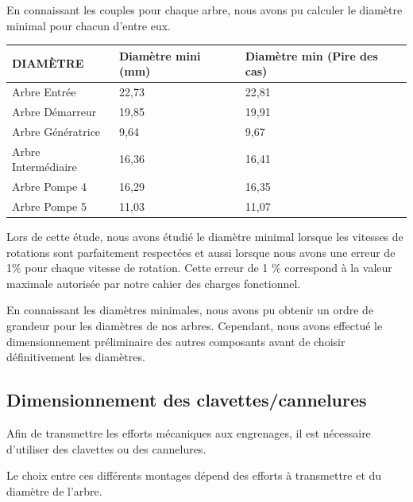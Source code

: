 \documentclass{config}
\begin{document}
\begin{spacing}{1.2}
En connaissant les couples pour chaque arbre, nous avons pu calculer le diamètre minimal pour chacun d'entre eux.

\begin{table}[h]
\centering
\begin{tabular}{|l|l|l|}
\hline
DIAMÈTRE & Diamètre mini (mm) & Diamètre min (Pire des cas) \\ \hline
Arbre Entrée & 22,73 & 22,81 \\ \hline
Arbre Démarreur & 19,85 & 19,91 \\ \hline
Arbre Génératrice & 9,64 & 9,67 \\ \hline
Arbre Intermédiaire & 16,36 & 16,41 \\ \hline
Arbre Pompe 4 & 16,29 & 16,35 \\ \hline
Arbre Pompe 5 & 11,03 & 11,07 \\ \hline
\end{tabular}
\end{table}

Lors de cette étude, nous avons étudié le diamètre minimal lorsque les vitesses de rotations sont parfaitement respectées et aussi lorsque nous avons une erreur de 1\% pour chaque vitesse de rotation. Cette erreur de 1 \% correspond à la valeur maximale autorisée par notre cahier des charges fonctionnel.

En connaissant les diamètres minimales, nous avons pu obtenir un ordre de grandeur pour les diamètres de nos arbres. Cependant, nous avons effectué le dimensionnement préliminaire des autres composants avant de choisir définitivement les diamètres.

\newpage
\subsection{Dimensionnement des clavettes/cannelures}
Afin de transmettre les efforts mécaniques aux engrenages, il est nécessaire d'utiliser des clavettes ou des cannelures. 

Le choix entre ces différents montages dépend des efforts à transmettre et du diamètre de l'arbre.


\end{spacing}
\end{document}
